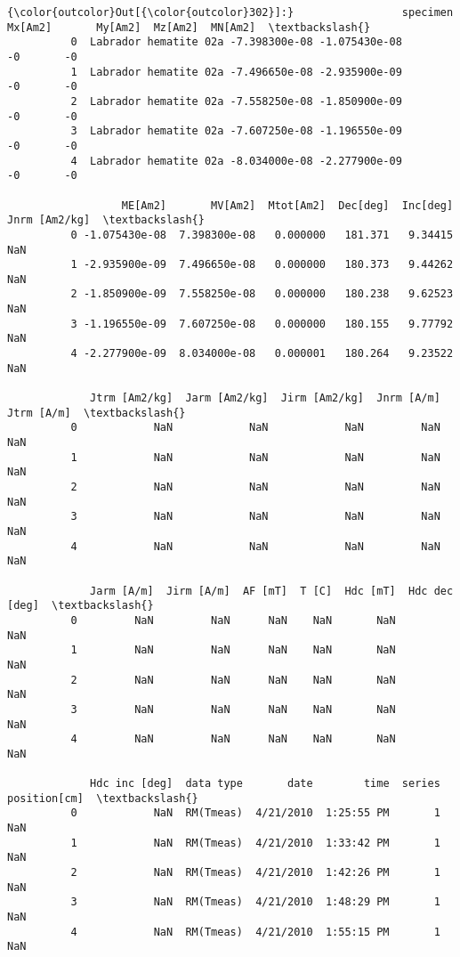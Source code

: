 \documentclass{article}
\begin{document}
            \begin{Verbatim}[commandchars=\\\{\}]
{\color{outcolor}Out[{\color{outcolor}302}]:}                 specimen       Mx[Am2]       My[Am2]  Mz[Am2]  MN[Am2]  \textbackslash{}
          0  Labrador hematite 02a -7.398300e-08 -1.075430e-08       -0       -0   
          1  Labrador hematite 02a -7.496650e-08 -2.935900e-09       -0       -0   
          2  Labrador hematite 02a -7.558250e-08 -1.850900e-09       -0       -0   
          3  Labrador hematite 02a -7.607250e-08 -1.196550e-09       -0       -0   
          4  Labrador hematite 02a -8.034000e-08 -2.277900e-09       -0       -0   
          
                  ME[Am2]       MV[Am2]  Mtot[Am2]  Dec[deg]  Inc[deg]  Jnrm [Am2/kg]  \textbackslash{}
          0 -1.075430e-08  7.398300e-08   0.000000   181.371   9.34415            NaN   
          1 -2.935900e-09  7.496650e-08   0.000000   180.373   9.44262            NaN   
          2 -1.850900e-09  7.558250e-08   0.000000   180.238   9.62523            NaN   
          3 -1.196550e-09  7.607250e-08   0.000000   180.155   9.77792            NaN   
          4 -2.277900e-09  8.034000e-08   0.000001   180.264   9.23522            NaN   
          
             Jtrm [Am2/kg]  Jarm [Am2/kg]  Jirm [Am2/kg]  Jnrm [A/m]  Jtrm [A/m]  \textbackslash{}
          0            NaN            NaN            NaN         NaN         NaN   
          1            NaN            NaN            NaN         NaN         NaN   
          2            NaN            NaN            NaN         NaN         NaN   
          3            NaN            NaN            NaN         NaN         NaN   
          4            NaN            NaN            NaN         NaN         NaN   
          
             Jarm [A/m]  Jirm [A/m]  AF [mT]  T [C]  Hdc [mT]  Hdc dec [deg]  \textbackslash{}
          0         NaN         NaN      NaN    NaN       NaN            NaN   
          1         NaN         NaN      NaN    NaN       NaN            NaN   
          2         NaN         NaN      NaN    NaN       NaN            NaN   
          3         NaN         NaN      NaN    NaN       NaN            NaN   
          4         NaN         NaN      NaN    NaN       NaN            NaN   
          
             Hdc inc [deg]  data type       date        time  series  position[cm]  \textbackslash{}
          0            NaN  RM(Tmeas)  4/21/2010  1:25:55 PM       1           NaN   
          1            NaN  RM(Tmeas)  4/21/2010  1:33:42 PM       1           NaN   
          2            NaN  RM(Tmeas)  4/21/2010  1:42:26 PM       1           NaN   
          3            NaN  RM(Tmeas)  4/21/2010  1:48:29 PM       1           NaN   
          4            NaN  RM(Tmeas)  4/21/2010  1:55:15 PM       1           NaN   
          

\end{Verbatim}
\end{document}
